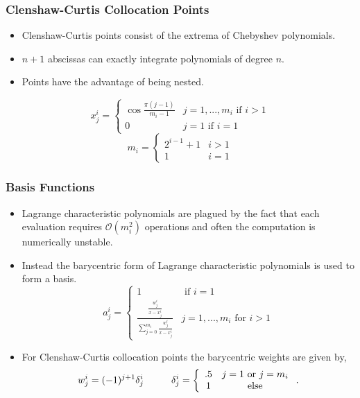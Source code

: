\documentclass{beamer}
\begin{document}
\begin{frame}
\frametitle{Clenshaw-Curtis Collocation Points}

\begin{itemize}  
  \item Clenshaw-Curtis points consist of the extrema of Chebyshev polynomials. 
  \item $n + 1 $ abscissas can exactly integrate polynomials of degree $n$.
  \item Points have the advantage of being nested.
\end{itemize}
\begin{equation}
    x_{j}^{i} = \left\{
     \begin{array}{cr}
       \cos\frac{\pi(j-1)}{m_i-1}   & j=1,...,m_i \text{ if } i>1 \\
       0   &  j=1 \text{ if } i=1
     \end{array}
   \right. \nonumber
\end{equation} 
\begin{equation} 
    m_i = \left\{
     \begin{array}{cr}
      2^{i-1}+1   & i>1 \\
      1   & i=1
     \end{array}
    \right. \nonumber
\end{equation}

\end{frame}
\begin{frame}
\frametitle{Basis Functions}

\begin{itemize}  
  \item Lagrange characteristic polynomials are plagued by the fact that each evaluation requires $\mathcal{O}(m_i^2)$ operations and often the computation is numerically unstable.
  \item Instead the barycentric form of Lagrange characteristic polynomials is used to form a basis. 
\begin{equation} 
    a_j^i = \left\{
     \begin{array}{cc}
      1   & \text{ if } i=1 \\
      \displaystyle \frac{\frac{w_j^i}{x-x_j^i} }
       {\sum_{j=0}^{m_i} 
        \frac{w_j^i}{x-x_j^i}}   & j=1,...,m_i \text{ for } i>1
     \end{array}
    \right. \nonumber
\end{equation}
  \item For Clenshaw-Curtis collocation points the barycentric weights are given by,
\begin{equation} 
    w_j^i = (-1)^{j+1}\delta_j^i \hspace{1 cm}
     \delta_j^i = \left\{
                   \begin{array}{cc}
                    .5   & j=1 \text{ or } j=m_i \\
                    1   & \text{ else }  
				   \end{array}
				  \right. . \nonumber                   
\end{equation}        
\end{itemize}

\end{frame}
\end{document}
